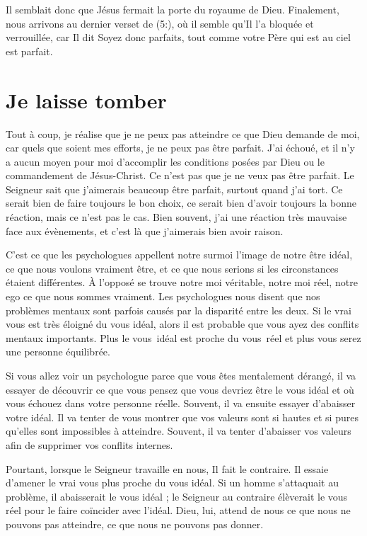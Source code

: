 Il semblait donc que Jésus fermait la porte du royaume de Dieu.
 Finalement, nous arrivons au dernier verset de (5:),
 où il semble qu'Il l'a bloquée et verrouillée, car Il dit\frcolon{}
 \Og Soyez donc parfaits,
 tout comme votre Père qui est au ciel est parfait. \Fg{}


\section{Je laisse tomber}

Tout à coup, je réalise que je ne peux pas atteindre
 ce que Dieu demande de moi, car quels que soient mes efforts,
 je ne peux pas être parfait.
 J'ai échoué, et il n'y a aucun moyen pour moi d'accomplir
 les conditions posées par Dieu ou le commandement de Jésus-Christ.
 Ce n'est pas que je ne veux pas être parfait.
 Le Seigneur sait que j'aimerais beaucoup être parfait,
 surtout quand j'ai tort.
 Ce serait bien de faire toujours le bon choix,
 ce serait bien d'avoir toujours la bonne réaction,
 mais ce n'est pas le cas.
 Bien souvent, j'ai une réaction très mauvaise face aux évènements,
 et c'est là que j'aimerais bien avoir raison.

C'est ce que les psychologues appellent notre surmoi
 \ocadr l'image de notre être idéal, ce que nous voulons vraiment être,
 et ce que nous serions si les circonstances étaient différentes.
 À l'opposé se trouve notre moi véritable, notre moi réel, notre ego
 \ocadr ce que nous sommes vraiment.
 Les psychologues nous disent que nos problèmes mentaux
 sont parfois causés par la disparité entre les deux.
 Si le vrai vous est très éloigné du vous idéal, alors il est probable
 que vous ayez des conflits mentaux importants.
 Plus le vous~idéal est proche du vous~réel
 et plus vous serez une personne équilibrée.

Si vous allez voir un psychologue parce que vous êtes mentalement dérangé,
 il va essayer de découvrir ce que vous pensez que vous devriez être
 \ocadr le vous idéal \fcadr{}
 et où vous échouez dans votre personne réelle.
 Souvent, il va ensuite essayer d'abaisser votre idéal.
 Il va tenter de vous montrer que vos valeurs sont si hautes et si pures
 qu'elles sont impossibles à atteindre.
 Souvent, il va tenter d'abaisser vos valeurs
 afin de supprimer vos conflits internes.

Pourtant, lorsque le Seigneur travaille en nous, Il fait le contraire.
 Il essaie d'amener le vrai vous plus proche du vous idéal.
 Si un homme s'attaquait au problème, il abaisserait le vous idéal ;
 le Seigneur au contraire élèverait le vous réel
 pour le faire coïncider avec l'idéal.
 Dieu, lui, attend de nous ce que nous ne pouvons pas atteindre,
 ce que nous ne pouvons pas donner.


